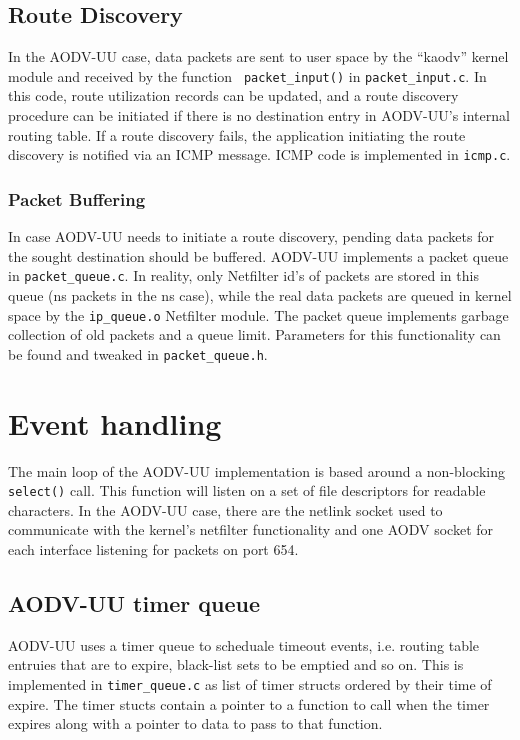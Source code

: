 \documentclass[swedish,10pt,twocolumn]{article}
\begin{document}
\subsection{Route Discovery}

In the AODV-UU case, data packets are sent to user space by the
``kaodv'' kernel module and received by the function {\tt
packet\_input()} in {\tt packet\_input.c}. In this code, route
utilization records can be updated, and a route discovery procedure
can be initiated if there is no destination entry in AODV-UU's
internal routing table. If a route discovery fails, the application
initiating the route discovery is notified via an ICMP message. ICMP
code is implemented in {\tt icmp.c}.

\subsubsection{Packet Buffering}

In case AODV-UU needs to initiate a route discovery, pending data
packets for the sought destination should be buffered. AODV-UU
implements a packet queue in {\tt packet\_queue.c}. In reality, only
Netfilter id's of packets are stored in this queue (ns packets in the
ns case), while the real data packets are queued in kernel space by
the {\tt ip\_queue.o} Netfilter module. The packet queue implements
garbage collection of old packets and a queue limit. Parameters for
this functionality can be found and tweaked in {\tt packet\_queue.h}.

\section{Event handling}
The main loop of the AODV-UU implementation is based around a
non-blocking {\tt select()} call. This function will listen on a set
of file descriptors for readable characters. In the AODV-UU case,
there are the netlink socket used to communicate with the kernel's
netfilter functionality and one AODV socket for each interface
listening for packets on port 654.

\subsection{AODV-UU timer queue}

AODV-UU uses a timer queue to scheduale timeout events, i.e. routing
table entruies that are to expire, black-list sets to be emptied and
so on. This is implemented in {\tt timer\_queue.c} as list of timer
structs ordered by their time of expire. The timer stucts contain a
pointer to a function to call when the timer expires along with a
pointer to data to pass to that function. 
\end{document}
